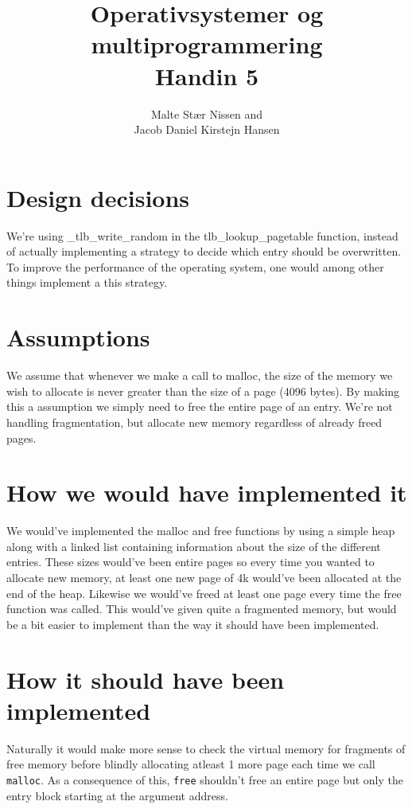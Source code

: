 \documentclass[11pt,a4paper]{article}
\title{Operativsystemer og multiprogrammering \\ Handin 5}
\author{Malte Stær Nissen and \\
        Jacob Daniel Kirstejn Hansen}
\begin{document}
\maketitle

\tableofcontents
\newpage

\section{Design decisions}
We're using \_tlb\_write\_random in the tlb\_lookup\_pagetable function,
instead of actually implementing a strategy to decide which entry should be
overwritten. To improve the performance of the operating system, one would
among other things implement a this strategy.

\section{Assumptions}
We assume that whenever we make a call to malloc, the size of the memory we
wish to allocate is never greater than the size of a page (4096 bytes). By
making this a assumption we simply need to free the entire page of an entry.
We're not handling fragmentation, but allocate new memory regardless of already
freed pages.


\section{How we would have implemented it}
We would've implemented the malloc and free functions by using a simple heap along with a linked list containing information about the size of the different entries. These sizes would've been entire pages so every time you wanted to allocate new memory, at least one new page of 4k would've been allocated at the end of the heap. Likewise we would've freed at least one page every time the free function was called. This would've given quite a fragmented memory, but would be a bit easier to implement than the way it should have been implemented.


\section{How it should have been implemented}
Naturally it would make more sense to check the virtual memory for fragments of
free memory before blindly allocating atleast 1 more page each time we call
\texttt{malloc}. As a consequence of this, \texttt{free} shouldn't free an
entire page but only the entry block starting at the argument address.
\end{document}
